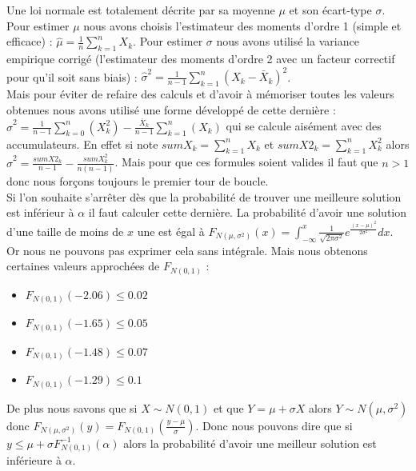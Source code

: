 \documentclass[12pt,a4paper]{article}
\begin{document}
Une loi normale est totalement décrite par sa moyenne $\mu$ et son écart-type $\sigma$. Pour estimer $\mu$ nous avons choisis l’estimateur des moments d'ordre 1 (simple et efficace) : $\widehat{\mu} = \frac{1}{n} \sum \limits_{k = 1} ^{n} X_k$. Pour estimer $\sigma$ nous avons utilisé la variance empirique corrigé (l'estimateur des moments d'ordre 2 avec un facteur correctif pour qu'il soit sans biais) : $\widehat{\sigma}^2 = \frac{1}{n-1} \sum \limits_{k = 1} ^{n} \left( X_k - \bar{X}_k \right) ^2$.\\
Mais pour éviter de refaire des calculs et d'avoir à mémoriser toutes les valeurs obtenues nous avons utilisé une forme développé de cette dernière : $\widehat{\sigma}^2 = \frac{1}{n-1} \sum \limits_{k=0} ^n \left( X_k ^2 \right) - \frac{ \bar{X}_k }{n-1} \sum \limits_{k=1} ^{n} \left( X_k \right)$ qui se calcule aisément avec des accumulateurs. En effet si note $sumX_k = \sum \limits_{k=1} ^{n} X_k$ et $sumX2_{k} = \sum \limits_{k=1} ^{n} X_k ^2$ alors $\widehat{\sigma}^2 = \frac{sumX2_k}{n-1} - \frac{sumX_k ^2}{n(n-1)}$. Mais pour que ces formules soient valides il faut que $n > 1$ donc nous forçons toujours le premier tour de boucle.\\

Si l'on souhaite s’arrêter dès que la probabilité de trouver une meilleure solution est inférieur à $\alpha$ il faut calculer cette dernière. La probabilité d'avoir une solution d'une taille de moins de $x$ une est égal à $F_{N(\mu,\sigma^2)} (x) = \int _{- \infty} ^{x} \frac{1}{\sqrt{2 \pi \sigma ^2}} e^{ \frac{\left( x - \mu \right)^2}{2 \sigma^2} } dx$. Or nous ne pouvons pas exprimer cela sans intégrale. Mais nous obtenons certaines valeurs approchées de $F_{N(0,1)}$ :
\begin{itemize}
\item
$F_{N(0,1)} (-2.06) \leqslant 0.02$
\item
$F_{N(0,1)} (-1.65) \leqslant 0.05$
\item
$F_{N(0,1)} (-1.48) \leqslant 0.07$
\item
$F_{N(0,1)} (-1.29) \leqslant 0.1$
\end{itemize}
De plus nous savons que si $X \sim N(0,1)$ et que $Y = \mu + \sigma X$ alors $Y \sim N(\mu, \sigma ^2)$ donc $F_{N(\mu,\sigma^2)} (y) = F_{N(0 , 1)} (\frac{y-\mu}{\sigma})$. Donc nous pouvons dire que si $y \leqslant \mu + \sigma F^{-1} _{N(0,1)} ( \alpha)$ alors la probabilité d'avoir une meilleur solution est inférieure à $\alpha$.\\
\end{document}
